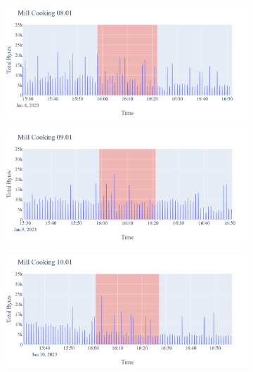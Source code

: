 \begin{figure}[H]
    \begin{subfigure}[b]{0.5\textwidth}
        \centering
        \includegraphics[width=1.2\hsize]{figures/Mill_Cooking_Bytes_08.01.png}
    \end{subfigure}
    \begin{subfigure}[b]{0.5\textwidth}
        \centering
        \includegraphics[width=1.2\hsize]{figures/Mill_Cooking_Bytes_09.01.png}
    \end{subfigure}
    \begin{subfigure}[b]{0.5\textwidth}
        \centering
        \includegraphics[width=1.2\hsize]{figures/Mill_Cooking_Bytes_10.01.png}
    \end{subfigure}
    \begin{subfigure}[b]{0.5\textwidth}

\end{subfigure}
\end{figure}
